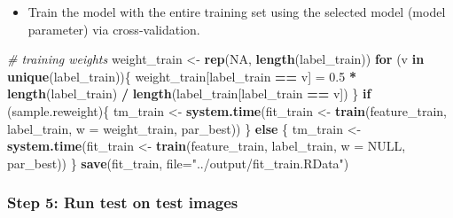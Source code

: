 \documentclass[
]{article}
\newenvironment{Shaded}{\begin{snugshade}}{\end{snugshade}}
\newcommand{\CommentTok}[1]{\textcolor[rgb]{0.56,0.35,0.01}{\textit{#1}}}
\newcommand{\ControlFlowTok}[1]{\textcolor[rgb]{0.13,0.29,0.53}{\textbf{#1}}}
\newcommand{\DataTypeTok}[1]{\textcolor[rgb]{0.13,0.29,0.53}{#1}}
\newcommand{\FloatTok}[1]{\textcolor[rgb]{0.00,0.00,0.81}{#1}}
\newcommand{\KeywordTok}[1]{\textcolor[rgb]{0.13,0.29,0.53}{\textbf{#1}}}
\newcommand{\NormalTok}[1]{#1}
\newcommand{\OperatorTok}[1]{\textcolor[rgb]{0.81,0.36,0.00}{\textbf{#1}}}
\newcommand{\OtherTok}[1]{\textcolor[rgb]{0.56,0.35,0.01}{#1}}
\newcommand{\StringTok}[1]{\textcolor[rgb]{0.31,0.60,0.02}{#1}}
\providecommand{\tightlist}{%
  \setlength{\itemsep}{0pt}\setlength{\parskip}{0pt}}
\begin{document}
\begin{Shaded}
\end{Shaded}

\begin{itemize}
\tightlist
\item
  Train the model with the entire training set using the selected model
  (model parameter) via cross-validation.
\end{itemize}

\begin{Shaded}
\begin{Highlighting}[]
\CommentTok{# training weights}
\NormalTok{weight_train <-}\StringTok{ }\KeywordTok{rep}\NormalTok{(}\OtherTok{NA}\NormalTok{, }\KeywordTok{length}\NormalTok{(label_train))}
\ControlFlowTok{for}\NormalTok{ (v }\ControlFlowTok{in} \KeywordTok{unique}\NormalTok{(label_train))\{}
\NormalTok{  weight_train[label_train }\OperatorTok{==}\StringTok{ }\NormalTok{v] =}\StringTok{ }\FloatTok{0.5} \OperatorTok{*}\StringTok{ }\KeywordTok{length}\NormalTok{(label_train) }\OperatorTok{/}\StringTok{ }\KeywordTok{length}\NormalTok{(label_train[label_train }\OperatorTok{==}\StringTok{ }\NormalTok{v])}
\NormalTok{\}}
\ControlFlowTok{if}\NormalTok{ (sample.reweight)\{}
\NormalTok{  tm_train <-}\StringTok{ }\KeywordTok{system.time}\NormalTok{(fit_train <-}\StringTok{ }\KeywordTok{train}\NormalTok{(feature_train, label_train, }\DataTypeTok{w =}\NormalTok{ weight_train, par_best))}
\NormalTok{\} }\ControlFlowTok{else}\NormalTok{ \{}
\NormalTok{  tm_train <-}\StringTok{ }\KeywordTok{system.time}\NormalTok{(fit_train <-}\StringTok{ }\KeywordTok{train}\NormalTok{(feature_train, label_train, }\DataTypeTok{w =} \OtherTok{NULL}\NormalTok{, par_best))}
\NormalTok{\}}
\KeywordTok{save}\NormalTok{(fit_train, }\DataTypeTok{file=}\StringTok{"../output/fit_train.RData"}\NormalTok{)}
\end{Highlighting}
\end{Shaded}

\hypertarget{step-5-run-test-on-test-images-3}{%
\subsubsection{Step 5: Run test on test
images}\label{step-5-run-test-on-test-images-3}}
\end{document}
